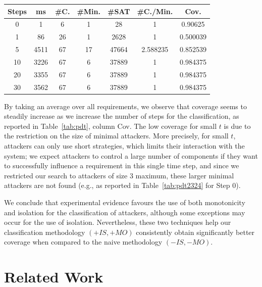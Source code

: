 {\begin{table}[!t]
\begin{minipage}{0.45\textwidth}
{\begin{tabular}{|c|c|c|c|c|c|c|}
\hline
Steps & ms &  \#C. & \#Min. & \#SAT & \#C./Min. & Cov.\\
\hline
0 & 1 & 6 & 1 & 28 & 1 & 0.90625\\
1 & 86 & 26 & 1 & 2628 & 1 & 0.500039\\
5 & 4511 & 67 & 17 & 47664 & 2.588235 & 0.852539\\
10 & 3226 & 67 & 6 & 37889 & 1 & 0.984375\\
20 & 3355 & 67 & 6 & 37889 & 1 & 0.984375\\
30 & 3562 & 67 & 6 & 37889 & 1 & 0.984375\\
 \hline
\end{tabular}
}
\label{tab:pdt2367}
\end{minipage}
\end{table}
By taking an average over all requirements, we observe that coverage seems to steadily increase as we increase the number of steps for the classification, as reported in Table~\ref{tab:pdt}, column Cov. The low coverage for small $t$ is due to the restriction on the size of minimal attackers. More precisely, for small $t$, attackers can only use short strategies, which limits their interaction with the system; we expect attackers to control a large number of components if they want to successfully influence a requirement in this single time step, and since we restricted our search to attackers of size 3 maximum, these larger minimal attackers are not found (e.g., as reported in Table~\ref{tab:pdt2324} for Step 0).

We conclude that experimental evidence favours the use of both monotonicity and isolation for the classification of attackers, although  some exceptions may occur for the use of isolation. Nevertheless, these two techniques help our classification methodology $(+IS,+MO)$ consistently obtain significantly better coverage when compared to the naive methodology $(-IS,-MO)$.

\section{Related Work}
\label{sec:discussion}

}

